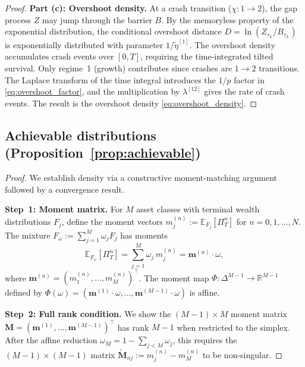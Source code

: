 \documentclass[11pt,a4paper]{article}
\numberwithin{equation}{section}
\newcommand{\E}{\mathbb{E}}
\newcommand{\R}{\mathbb{R}}
\begin{document}
\begin{appendices}
\begin{proof}
\textbf{Part (c): Overshoot density.} At a crash transition ($\chi: 1 \to 2$), the gap process $Z$ may jump through the barrier $B$. By the memoryless property of the exponential distribution, the conditional overshoot distance $D = \ln(Z_{\tau_L}/B_{\tau_L})$ is exponentially distributed with parameter $1/\tilde\eta^{[1]}$.  The overshoot density accumulates crash events over $[0,T]$, requiring the time-integrated tilted survival.  Only regime~1 (growth) contributes since crashes are $1 \to 2$ transitions.  The Laplace transform of the time integral introduces the $1/p$ factor in \eqref{eq:overshoot_factor}, and the multiplication by $\lambda^{[12]}$ gives the rate of crash events. The result is the overshoot density \eqref{eq:overshoot_density}.
\end{proof}



\subsection{Achievable distributions (Proposition~\ref{prop:achievable})}\label{app:density_proof}

\begin{proof}
We establish density via a constructive moment-matching argument followed by a convergence result.

\medskip\noindent\textbf{Step~1: Moment matrix.}
For $M$ asset classes with terminal wealth distributions $F_j$, define the moment vectors $m^{(n)}_j := \E_{F_j}[\Pi_T^n]$ for $n = 0, 1, \ldots, N$.  The mixture $F_\omega := \sum_{j=1}^M \omega_j F_j$ has moments
\begin{equation}\label{eq:mixture_moments}
\E_{F_\omega}[\Pi_T^n] = \sum_{j=1}^M \omega_j\, m^{(n)}_j = \bm{m}^{(n)} \cdot \omega,
\end{equation}
where $\bm{m}^{(n)} = (m^{(n)}_1, \ldots, m^{(n)}_M)^\top$.  The moment map $\Phi : \Delta^{M-1} \to \R^{M-1}$ defined by $\Phi(\omega) = (\bm{m}^{(1)} \cdot \omega, \ldots, \bm{m}^{(M-1)} \cdot \omega)$ is affine.

\medskip\noindent\textbf{Step~2: Full rank condition.}
We show the $(M-1) \times M$ moment matrix $\mathbf{M} = (\bm{m}^{(1)}, \ldots, \bm{m}^{(M-1)})^\top$ has rank $M-1$ when restricted to the simplex.  After the affine reduction $\omega_M = 1 - \sum_{j<M} \omega_j$, this requires the $(M-1) \times (M-1)$ matrix $\tilde{\mathbf{M}}_{nj} := m^{(n)}_j - m^{(n)}_M$ to be non-singular.


\end{proof}
\end{appendices}
\end{document}
